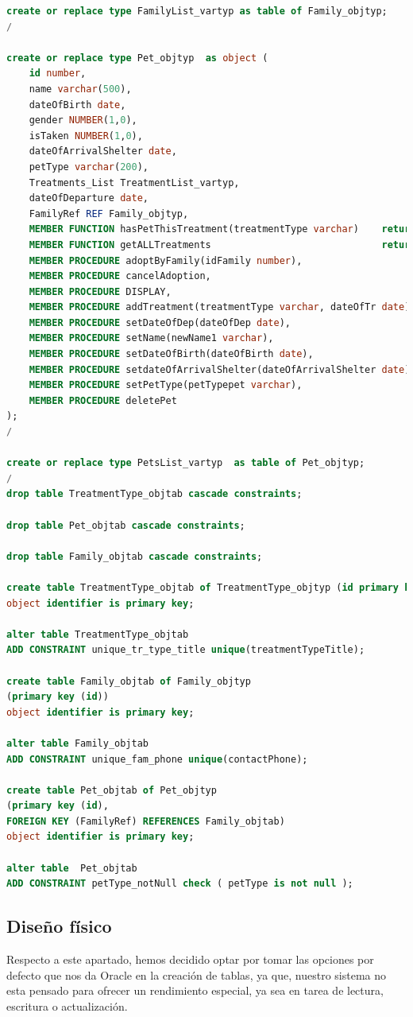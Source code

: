 \documentclass{FR16}
\begin{document}
\begin{justify}
\begin{lstlisting}[language=Sql, basicstyle=\scriptsize]
create or replace type FamilyList_vartyp as table of Family_objtyp;
/

create or replace type Pet_objtyp  as object (
    id number,
    name varchar(500),
    dateOfBirth date,
    gender NUMBER(1,0),
    isTaken NUMBER(1,0),
    dateOfArrivalShelter date,
    petType varchar(200),
    Treatments_List TreatmentList_vartyp,
    dateOfDeparture date,
    FamilyRef REF Family_objtyp,
    MEMBER FUNCTION hasPetThisTreatment(treatmentType varchar)    return number,
    MEMBER FUNCTION getALLTreatments                              return TreatmentList_vartyp,
    MEMBER PROCEDURE adoptByFamily(idFamily number),
    MEMBER PROCEDURE cancelAdoption,
    MEMBER PROCEDURE DISPLAY,
    MEMBER PROCEDURE addTreatment(treatmentType varchar, dateOfTr date),
    MEMBER PROCEDURE setDateOfDep(dateOfDep date),
    MEMBER PROCEDURE setName(newName1 varchar),
    MEMBER PROCEDURE setDateOfBirth(dateOfBirth date),
    MEMBER PROCEDURE setdateOfArrivalShelter(dateOfArrivalShelter date),
    MEMBER PROCEDURE setPetType(petTypepet varchar),
    MEMBER PROCEDURE deletePet
);
/

create or replace type PetsList_vartyp  as table of Pet_objtyp;
/
drop table TreatmentType_objtab cascade constraints;

drop table Pet_objtab cascade constraints;

drop table Family_objtab cascade constraints;

create table TreatmentType_objtab of TreatmentType_objtyp (id primary key) 
object identifier is primary key;

alter table TreatmentType_objtab
ADD CONSTRAINT unique_tr_type_title unique(treatmentTypeTitle);

create table Family_objtab of Family_objtyp
(primary key (id))
object identifier is primary key;

alter table Family_objtab
ADD CONSTRAINT unique_fam_phone unique(contactPhone);

create table Pet_objtab of Pet_objtyp 
(primary key (id),
FOREIGN KEY (FamilyRef) REFERENCES Family_objtab)
object identifier is primary key;

alter table  Pet_objtab 
ADD CONSTRAINT petType_notNull check ( petType is not null );

\end{lstlisting}

\end{justify}


\subsection{Diseño físico}
\begin{justify}

Respecto a este apartado, hemos decidido optar por tomar las opciones por defecto que nos da Oracle en la creación de tablas, ya que, nuestro sistema no esta pensado para ofrecer un rendimiento especial, ya sea en tarea de lectura, escritura o actualización.

\end{justify}
\newpage
\end{document}
